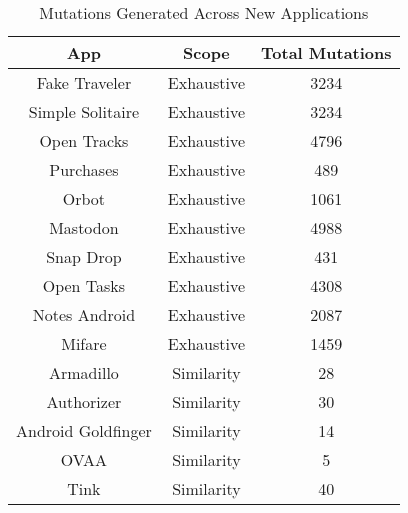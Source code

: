 \begin{table*}
    
    \centering
    \caption{\small Mutations Generated Across New Applications}
    \label{table:new_mutations}
    \begin{tabular}{ |c|c|c| } 
     \hline
    App & Scope & Total Mutations \\
    \hline
    Fake Traveler & Exhaustive & 3234 \\
    \hline
    Simple Solitaire & Exhaustive & 3234 \\
    \hline
    Open Tracks & Exhaustive & 4796 \\
    \hline
    Purchases & Exhaustive & 489 \\
    \hline
    Orbot & Exhaustive & 1061 \\
    \hline
    Mastodon & Exhaustive & 4988 \\
    \hline
    Snap Drop & Exhaustive & 431 \\
    \hline
    Open Tasks & Exhaustive & 4308 \\
    \hline
    Notes Android & Exhaustive & 2087 \\
    \hline
    Mifare & Exhaustive & 1459 \\
    \hline
    Armadillo & Similarity & 28 \\
    \hline
    Authorizer & Similarity & 30 \\
    \hline
    Android Goldfinger & Similarity & 14 \\
     \hline
    OVAA & Similarity & 5 \\
    \hline
    Tink & Similarity & 40 \\
     \hline
    \end{tabular}
    \end{table*}
